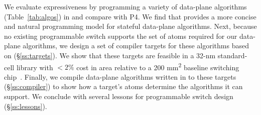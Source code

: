 

We evaluate expressiveness by programming a variety of data-plane algorithms
(Table~\ref{tab:algos}) in \pktlanguage and compare with P4. We find that
\pktlanguage provides a more concise and natural programming model for stateful
data-plane algorithms.  Next, because no existing programmable switch supports
the set of atoms required for our data-plane algorithms, we design a set of
compiler targets for these algorithms based on \absmachine
(\S\ref{ss:targets}).  We show that these targets are feasible in a 32-nm
standard-cell library with $< 2\%$ cost in area relative to a 200
\si{\milli\metre\squared} baseline switching chip~\cite{gibb_parsing}.
Finally, we compile data-plane algorithms written in \pktlanguage to these
targets (\S\ref{ss:compiler}) to show how a target's atoms determine the
algorithms it can support. We conclude with several lessons for programmable
switch design (\S\ref{ss:lessons}).

